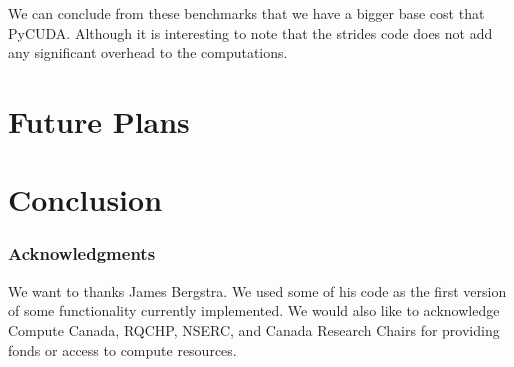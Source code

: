 \documentclass{article} %
\begin{document}
We can conclude from these benchmarks that we have a bigger base cost that PyCUDA.
Although it is interesting to note that the strides code does not add any significant overhead to the computations.

\section{Future Plans}
\section{Conclusion}

% 
% 


\subsubsection*{Acknowledgments}

We want to thanks James Bergstra. We used some of his code as the first version of some functionality currently implemented. We would also like to acknowledge Compute Canada, RQCHP, NSERC, and Canada Research Chairs for providing fonds or access to compute resources.




\end{document}
